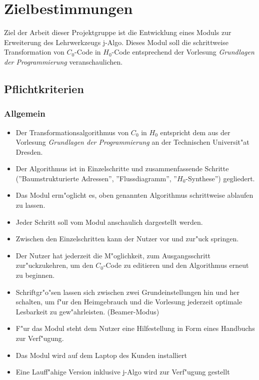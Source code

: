 ﻿\section{Zielbestimmungen}
Ziel der Arbeit dieser Projektgruppe ist die Entwicklung eines Moduls zur
Erweiterung des Lehrwerkzeugs j-Algo. Dieses Modul soll die schrittweise
Transformation von $C_0$-Code in $H_0$-Code entsprechend der Vorlesung
\textit{Grundlagen der Programmierung} veranschaulichen.

\subsection{Pflichtkriterien}

\begin{itemize}
	\subsubsection{Allgemein}
	\begin{itemize}
    \item Der Transformationsalgorithmus von $C_0$ in $H_0$ entspricht dem aus
    der Vorlesung \textit{Grundlagen der Programmierung} an der Technischen
    Universit"at Dresden.
    \item Der Algorithmus ist in Einzelschritte und zusammenfassende Schritte (''Baumstrukturierte Adressen'', ''Flussdiagramm'', ''$H_0$-Synthese'')
    gegliedert.
    \item Das Modul erm"oglicht es, oben genannten Algorithmus schrittweise
    ablaufen zu lassen.
    \item Jeder Schritt soll vom Modul anschaulich dargestellt werden.
    \item Zwischen den Einzelschritten kann der Nutzer vor und zur"uck
    springen.
    \item Der Nutzer hat jederzeit die M"oglichkeit, zum Ausgangsschritt
    zur"uckzukehren, um den $C_0$-Code zu editieren und den Algorithmus
    erneut zu beginnen.
		\item Schriftgr"o"sen lassen sich zwischen zwei Grundeinstellungen hin und her schalten,
		um f"ur den Heimgebrauch und die Vorlesung jederzeit optimale Lesbarkeit zu gew"ahrleisten. (Beamer-Modus)
    \item F"ur das Modul steht dem Nutzer eine Hilfestellung in Form eines
    Handbuchs zur Verf"ugung.
		\item Das Modul wird auf dem Laptop des Kunden installiert
		\item Eine Lauff"ahige Version inklusive j-Algo wird zur Verf"ugung gestellt
	\end{itemize}


\end{itemize}
